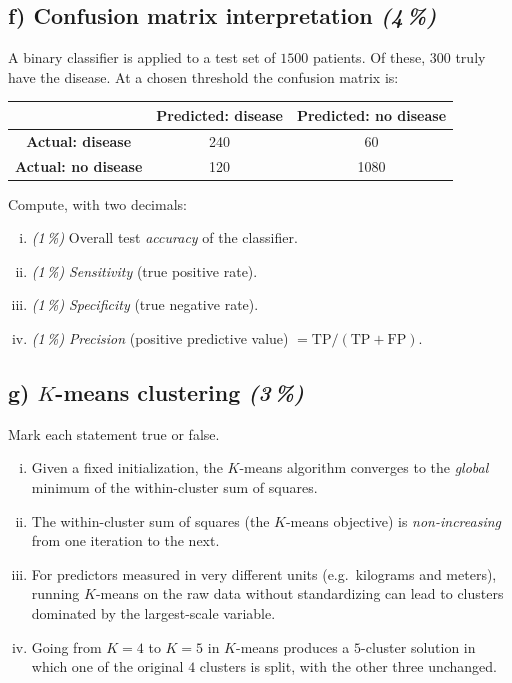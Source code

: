\documentclass[11pt,a4paper]{article}
\newcommand{\subpoints}[1]{\textit{(#1\,\%)}}
\begin{document}
\subsection*{f) Confusion matrix interpretation \subpoints{4}}
A binary classifier is applied to a test set of $1500$ patients. Of these, $300$ truly have the disease. At a chosen threshold the confusion matrix is:
\begin{center}\small
\begin{tabular}{c|cc}
 & \textbf{Predicted: disease} & \textbf{Predicted: no disease} \\ \hline
\textbf{Actual: disease}    & 240 & 60 \\
\textbf{Actual: no disease} & 120 & 1080 \\
\end{tabular}
\end{center}

Compute, with two decimals:
\begin{enumerate}[(i)]
  \item \subpoints{1} Overall test \emph{accuracy} of the classifier.
  \item \subpoints{1} \emph{Sensitivity} (true positive rate).
  \item \subpoints{1} \emph{Specificity} (true negative rate).
  \item \subpoints{1} \emph{Precision} (positive predictive value) $= \mathrm{TP}/(\mathrm{TP}+\mathrm{FP})$.
\end{enumerate}

\subsection*{g) $K$-means clustering \subpoints{3}}
Mark each statement true or false.
\begin{enumerate}[(i)]
  \item Given a fixed initialization, the $K$-means algorithm converges to the \emph{global} minimum of the within-cluster sum of squares.
  \item The within-cluster sum of squares (the $K$-means objective) is \emph{non-increasing} from one iteration to the next.
  \item For predictors measured in very different units (e.g.\ kilograms and meters), running $K$-means on the raw data without standardizing can lead to clusters dominated by the largest-scale variable.
  \item Going from $K = 4$ to $K = 5$ in $K$-means produces a $5$-cluster solution in which one of the original $4$ clusters is split, with the other three unchanged.
\end{enumerate}
\end{document}
